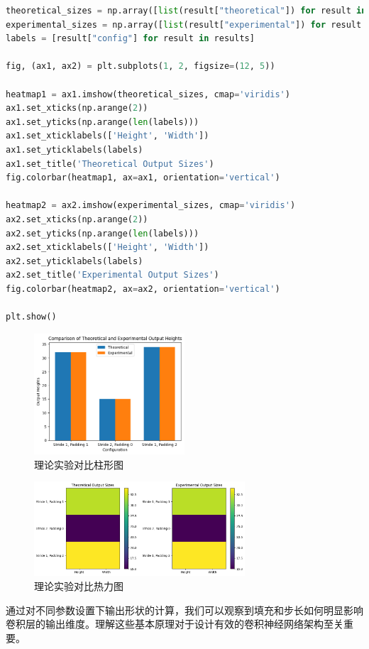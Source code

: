 \documentclass[a4paper,12pt]{article}
\begin{document}
\begin{lstlisting}[language=Python]
theoretical_sizes = np.array([list(result["theoretical"]) for result in results])
experimental_sizes = np.array([list(result["experimental"]) for result in results])
labels = [result["config"] for result in results]

fig, (ax1, ax2) = plt.subplots(1, 2, figsize=(12, 5))

heatmap1 = ax1.imshow(theoretical_sizes, cmap='viridis')
ax1.set_xticks(np.arange(2))
ax1.set_yticks(np.arange(len(labels)))
ax1.set_xticklabels(['Height', 'Width'])
ax1.set_yticklabels(labels)
ax1.set_title('Theoretical Output Sizes')
fig.colorbar(heatmap1, ax=ax1, orientation='vertical')

heatmap2 = ax2.imshow(experimental_sizes, cmap='viridis')
ax2.set_xticks(np.arange(2))
ax2.set_yticks(np.arange(len(labels)))
ax2.set_xticklabels(['Height', 'Width'])
ax2.set_yticklabels(labels)
ax2.set_title('Experimental Output Sizes')
fig.colorbar(heatmap2, ax=ax2, orientation='vertical')

plt.show()
\end{lstlisting}

\begin{figure}[htbp]
	\centering
	\includegraphics[width=0.5\textwidth]{9.png}
	\caption{理论实验对比柱形图}
\end{figure}

\begin{figure}[htbp]
\centering
\includegraphics[width=0.7\textwidth]{10.png}
\caption{理论实验对比热力图}
\end{figure}
通过对不同参数设置下输出形状的计算，我们可以观察到填充和步长如何明显影响卷积层的输出维度。理解这些基本原理对于设计有效的卷积神经网络架构至关重要。
\end{document}
